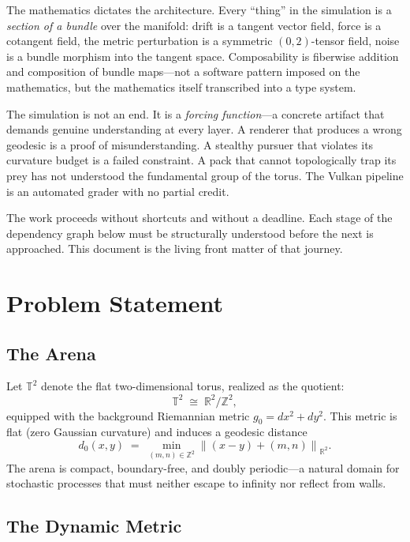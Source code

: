 The mathematics dictates the architecture. Every ``thing'' in the
simulation is a \emph{section of a bundle} over the manifold: drift is a
tangent vector field, force is a cotangent field, the metric perturbation is
a symmetric $(0,2)$-tensor field, noise is a bundle morphism into the
tangent space. Composability is fiberwise addition and composition of bundle
maps---not a software pattern imposed on the mathematics, but the mathematics
itself transcribed into a type system.

The simulation is not an end. It is a \emph{forcing function}---a concrete
artifact that demands genuine understanding at every layer. A renderer that
produces a wrong geodesic is a proof of misunderstanding. A stealthy pursuer
that violates its curvature budget is a failed constraint. A pack that cannot
topologically trap its prey has not understood the fundamental group of the
torus. The Vulkan pipeline is an automated grader with no partial credit.

The work proceeds without shortcuts and without a deadline. Each stage of the
dependency graph below must be structurally understood before the next is
approached. This document is the living front matter of that journey.

\section*{Problem Statement}

\subsection*{The Arena}

Let $\mathbb{T}^2$ denote the flat two-dimensional torus, realized as the
quotient:
\[
  \mathbb{T}^2 \;\cong\; \mathbb{R}^2 / \mathbb{Z}^2,
\]
equipped with the background Riemannian metric $g_0 = dx^2 + dy^2$. This
metric is flat (zero Gaussian curvature) and induces a geodesic distance
\[
  d_0(x, y) \;=\; \min_{(m,n)\in\mathbb{Z}^2}
    \left\| (x - y) + (m,n) \right\|_{\mathbb{R}^2}.
\]
The arena is compact, boundary-free, and doubly periodic---a natural domain
for stochastic processes that must neither escape to infinity nor reflect from walls.

\subsection*{The Dynamic Metric}

